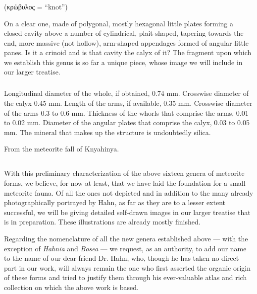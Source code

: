 \documentclass[a4paper, 12pt, oneside]{article}
\begin{document}
\subsubsection{}
\paragraph*{}
(κρὠβυλος = ``knot'')%

On a clear one, made of polygonal, mostly hexagonal little plates forming a closed cavity above a number of cylindrical, plait-shaped, tapering towards the end, more massive (not hollow), arm-shaped appendages formed of angular little panes. Is it a crinoid and is that cavity the calyx of it? The fragment upon which we establish this genus is so far a unique piece, whose image we will include in our larger treatise.
\paragraph{\large{}}
\subparagraph{}
Longitudinal diameter of the whole, if obtained, 0.74 mm. Crosswise diameter of the calyx 0.45 mm. Length of the arms, if available, 0.35 mm. Crosswise diameter of the arms 0.3 to 0.6 mm. Thickness of the whorls that comprise the arms, 0.01 to 0.02 mm. Diameter of the angular plates that comprise the calyx, 0.03 to 0.05 mm. The mineral that makes up the structure is undoubtedly silica.

From the meteorite fall of Knyahinya.
\clearpage
\subsection{}
\paragraph*{}
With this preliminary characterization of the above sixteen genera of meteorite forms, we believe, for now at least, that we have laid the foundation for a small meteorite fauna. Of all the ones not depicted and in addition to the many already photographically portrayed by Hahn, as far as they are to a lesser extent successful, we will be giving detailed self-drawn images in our larger treatise that is in preparation. These illustrations are already mostly finished.

Regarding the nomenclature of all the new genera established above --- with the exception of \emph{Hahnia} and \emph{Bosea} --- we request, as an authority, to add our name to the name of our dear friend Dr. Hahn, who, though he has taken no direct part in our work, will always remain the one who first asserted the organic origin of these forms and tried to justify them through his ever-valuable atlas and rich collection on which the above work is based.
\end{document}
